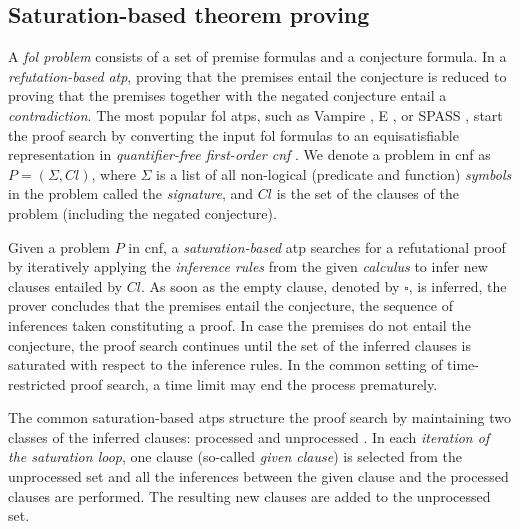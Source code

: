 


\subsection{Saturation-based theorem proving}
\label{sec:saturation}

A \emph{\acrfull{fol} problem} consists of a set of premise formulas and a conjecture formula.
In a \emph{refutation-based} \emph{\acrfull{atp}},
proving that the premises entail the conjecture
is reduced to proving that the premises together with the negated conjecture entail a \emph{contradiction}.
The most popular \gls{fol} \glspl{atp}, such as Vampire \cite{10.1007/978-3-642-39799-8_1}, E \cite{10.1007/978-3-030-29436-6_29}, or SPASS \cite{DBLP:conf/cade/WeidenbachDFKSW09},
start the proof search by converting the input \gls{fol} formulas to an equisatisfiable representation in \emph{quantifier-free first-order \gls{cnf}} \cite{Harrison2009}.
We denote a problem in \gls{cnf} as $P = (\Sigma, \mathit{Cl})$,
where $\Sigma$ is a list of all non-logical (predicate and function)
\emph{symbols} in the problem called the \emph{signature},
and $\mathit{Cl}$ is the set of the clauses of the problem (including the negated conjecture).

Given a problem $P$ in \gls{cnf},
a \emph{saturation-based} \gls{atp} searches for a refutational proof
by iteratively applying the \emph{inference rules} from the given \emph{calculus}
to infer new clauses entailed by $\mathit{Cl}$.
As soon as the empty clause, denoted by $\square$, is inferred,
the prover concludes that the premises entail the conjecture,
the sequence of inferences taken constituting a proof.
In case the premises do not entail the conjecture,
the proof search continues until
the set of the inferred clauses is saturated with respect to the inference rules.
In the common setting of time-restricted proof search, a time limit may end the process prematurely.

The common saturation-based \glspl{atp} structure the proof search
by maintaining two classes of the inferred clauses: processed and unprocessed \cite{10.1007/978-3-030-29436-6_29}.
In each \emph{iteration of the saturation loop}, one clause (so-called \emph{given clause})
is selected from the unprocessed set
and all the inferences between the given clause and the processed clauses are performed.
The resulting new clauses are added to the unprocessed set.

